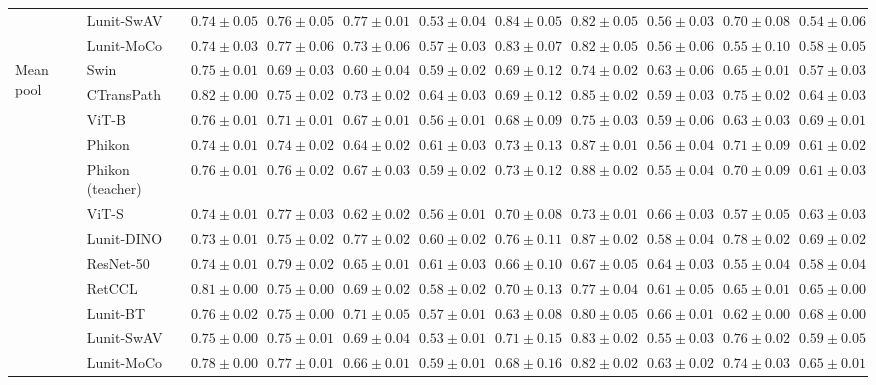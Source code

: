 \begin{tabular}{ll|cccc|c|cccc}
 & Lunit-SwAV & $0.74 \pm 0.05$ & $0.76 \pm 0.05$ & $0.77 \pm 0.01$ & $0.53 \pm 0.04$ & $0.84 \pm 0.05$ & $0.82 \pm 0.05$ & $0.56 \pm 0.03$ & $0.70 \pm 0.08$ & $0.54 \pm 0.06$ \\
 & Lunit-MoCo & $0.74 \pm 0.03$ & $0.77 \pm 0.06$ & $0.73 \pm 0.06$ & $0.57 \pm 0.03$ & $0.83 \pm 0.07$ & $0.82 \pm 0.05$ & $0.56 \pm 0.06$ & $0.55 \pm 0.10$ & $0.58 \pm 0.05$ \\
\cline{1-11}
\multirow[t]{12}{*}{Mean pool} & Swin & $0.75 \pm 0.01$ & $0.69 \pm 0.03$ & $0.60 \pm 0.04$ & $0.59 \pm 0.02$ & $0.69 \pm 0.12$ & $0.74 \pm 0.02$ & $0.63 \pm 0.06$ & $0.65 \pm 0.01$ & $0.57 \pm 0.03$ \\
 & CTransPath & $\mathbf{0.82 \pm 0.00}$ & $0.75 \pm 0.02$ & $0.73 \pm 0.02$ & $\mathbf{0.64 \pm 0.03}$ & $0.69 \pm 0.12$ & $0.85 \pm 0.02$ & $0.59 \pm 0.03$ & $0.75 \pm 0.02$ & $0.64 \pm 0.03$ \\
 & ViT-B & $0.76 \pm 0.01$ & $0.71 \pm 0.01$ & $0.67 \pm 0.01$ & $0.56 \pm 0.01$ & $0.68 \pm 0.09$ & $0.75 \pm 0.03$ & $0.59 \pm 0.06$ & $0.63 \pm 0.03$ & $\mathbf{0.69 \pm 0.01}$ \\
 & Phikon & $0.74 \pm 0.01$ & $0.74 \pm 0.02$ & $0.64 \pm 0.02$ & $0.61 \pm 0.03$ & $0.73 \pm 0.13$ & $0.87 \pm 0.01$ & $0.56 \pm 0.04$ & $0.71 \pm 0.09$ & $0.61 \pm 0.02$ \\
 & Phikon (teacher) & $0.76 \pm 0.01$ & $0.76 \pm 0.02$ & $0.67 \pm 0.03$ & $0.59 \pm 0.02$ & $0.73 \pm 0.12$ & $\mathbf{0.88 \pm 0.02}$ & $0.55 \pm 0.04$ & $0.70 \pm 0.09$ & $0.61 \pm 0.03$ \\
 & ViT-S & $0.74 \pm 0.01$ & $0.77 \pm 0.03$ & $0.62 \pm 0.02$ & $0.56 \pm 0.01$ & $0.70 \pm 0.08$ & $0.73 \pm 0.01$ & $\mathbf{0.66 \pm 0.03}$ & $0.57 \pm 0.05$ & $0.63 \pm 0.03$ \\
 & Lunit-DINO & $0.73 \pm 0.01$ & $0.75 \pm 0.02$ & $\mathbf{0.77 \pm 0.02}$ & $0.60 \pm 0.02$ & $\mathbf{0.76 \pm 0.11}$ & $0.87 \pm 0.02$ & $0.58 \pm 0.04$ & $\mathbf{0.78 \pm 0.02}$ & $0.69 \pm 0.02$ \\
 & ResNet-50 & $0.74 \pm 0.01$ & $\mathbf{0.79 \pm 0.02}$ & $0.65 \pm 0.01$ & $0.61 \pm 0.03$ & $0.66 \pm 0.10$ & $0.67 \pm 0.05$ & $0.64 \pm 0.03$ & $0.55 \pm 0.04$ & $0.58 \pm 0.04$ \\
 & RetCCL & $0.81 \pm 0.00$ & $0.75 \pm 0.00$ & $0.69 \pm 0.02$ & $0.58 \pm 0.02$ & $0.70 \pm 0.13$ & $0.77 \pm 0.04$ & $0.61 \pm 0.05$ & $0.65 \pm 0.01$ & $0.65 \pm 0.00$ \\
 & Lunit-BT & $0.76 \pm 0.02$ & $0.75 \pm 0.00$ & $0.71 \pm 0.05$ & $0.57 \pm 0.01$ & $0.63 \pm 0.08$ & $0.80 \pm 0.05$ & $0.66 \pm 0.01$ & $0.62 \pm 0.00$ & $0.68 \pm 0.00$ \\
 & Lunit-SwAV & $0.75 \pm 0.00$ & $0.75 \pm 0.01$ & $0.69 \pm 0.04$ & $0.53 \pm 0.01$ & $0.71 \pm 0.15$ & $0.83 \pm 0.02$ & $0.55 \pm 0.03$ & $0.76 \pm 0.02$ & $0.59 \pm 0.05$ \\
 & Lunit-MoCo & $0.78 \pm 0.00$ & $0.77 \pm 0.01$ & $0.66 \pm 0.01$ & $0.59 \pm 0.01$ & $0.68 \pm 0.16$ & $0.82 \pm 0.02$ & $0.63 \pm 0.02$ & $0.74 \pm 0.03$ & $0.65 \pm 0.01$ \\
\cline{1-11}
\bottomrule
\end{tabular}
